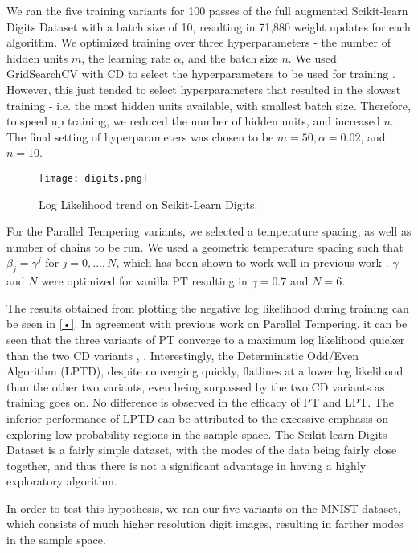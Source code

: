 We ran the five training variants for 100 passes of the full augmented Scikit-learn Digits Dataset with a batch size of 10, resulting in 71,880 weight updates for each algorithm. We optimized training over three hyperparameters - the number of hidden units $m$, the learning rate $\alpha$, and the batch size $n$. We used GridSearchCV with CD to select the hyperparameters to be used for training \cite{pedregosa2011scikit}. However, this just tended to select hyperparameters that resulted in the slowest training - i.e. the most hidden units available, with smallest batch size. Therefore, to speed up training, we reduced the number of hidden units, and increased $n$. The final setting of hyperparameters was chosen to be $m=50,  \alpha = 0.02$, and $n=10$.

\begin{figure}[ht!]
	\centering
	\texttt{[image: digits.png]}
\caption{Log Likelihood trend on Scikit-Learn Digits.}
\end{figure}

For the Parallel Tempering variants, we selected a temperature spacing, as well as number of chains to be run. We used a geometric temperature spacing such that $\beta_j = \gamma^j$  for $j = 0, ..., N$, which has been shown to work well in previous work \cite{kofke2002acceptance}. $\gamma$ and $N$ were optimized for vanilla PT resulting in $\gamma = 0.7$ and $N=6$.

The results obtained from plotting the negative log likelihood during training can be seen in \ref{•}. In agreement with previous work on Parallel Tempering, it can be seen that the three variants of PT converge to a maximum log likelihood quicker than the two CD variants \cite{desjardins2010tempered}, \cite{fischer2014training}. Interestingly, the Deterministic Odd/Even Algorithm (LPTD), despite converging quickly, flatlines at a lower log likelihood than the other two variants, even being surpassed by the two CD variants as training goes on. No difference is observed in the efficacy of PT and LPT. The inferior performance of LPTD can be attributed to the excessive emphasis on exploring low probability regions in the sample space. The Scikit-learn Digits Dataset is a fairly simple dataset, with the modes of the data being fairly close together, and thus there is not a significant advantage in having a highly exploratory algorithm.

In order to test this hypothesis, we ran our five variants on the MNIST dataset, which consists of much higher resolution digit images, resulting in farther modes in the sample space.

